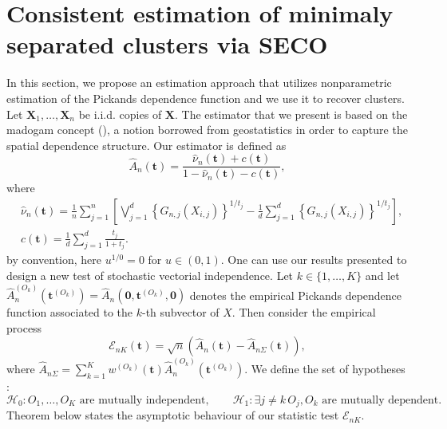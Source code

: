 \documentclass[11pt]{article}
\theoremstyle{definition}
\begin{document}
	\section{Consistent estimation of minimaly separated clusters via SECO}
	\label{sec:estimation}
	In this section, we propose an estimation approach that utilizes nonparametric estimation of the Pickands dependence function and we use it to recover clusters.
	Let $\textbf{X}_1, \dots, \textbf{X}_n$ be i.i.d. copies of $\textbf{X}$. The estimator that we present is based on the madogam concept (\cite{cooley2006variograms, MARCON20171}), a notion borrowed from geostatistics in order to capture the spatial dependence structure. Our estimator is defined as 
	\begin{equation}
		\hat{A}_n(\textbf{t}) = \frac{\hat{\nu}_n(\textbf{t}) + c(\textbf{t})}{1-\hat{\nu}_n(\textbf{t})-c(\textbf{t})},
	\end{equation}
	where
	\begin{align*}
		& \hat{\nu}_n(\textbf{t}) = \frac{1}{n} \sum_{j=1}^n \left[\bigvee_{j=1}^d \left\{ G_{n,j} (X_{i,j}) \right\}^{1/t_j} - \frac{1}{d} \sum_{j=1}^d \left\{ G_{n,j}(X_{i,j}) \right\}^{1/t_j} \right], \\
		& c(\textbf{t}) = \frac{1}{d} \sum_{j=1}^d \frac{t_j}{1+t_j}.
	\end{align*}
	by convention, here $u^{1/0} = 0$ for $u \in (0,1)$. One can use our results presented to design a new test of stochastic vectorial independence. Let $k\in\{1,\dots,K\}$ and let $\hat{A}_{n}^{(O_k)}(\textbf{t}^{(O_k)}) = \hat{A}_n(\textbf{0},\textbf{t}^{(O_k)}, \textbf{0})$ denotes the empirical Pickands dependence function associated to the $k$-th subvector of $X$. Then consider the empirical process
	\begin{equation}
		\mathcal{E}_{nK} (\textbf{t}) = \sqrt{n}\left(\hat{A}_n(\textbf{t}) - \hat{A}_{n\Sigma}(\textbf{t}) \right),
	\end{equation}
	where $\hat{A}_{n\Sigma} = \sum_{k=1}^K w^{(O_k)}(\textbf{t}) \hat{A}_{n}^{(O_k)}(\textbf{t}^{(O_k)})$. We define the set of hypotheses :
	\begin{equation*}
		\mathcal{H}_0 : O_1, \dots, O_K \textrm{ are mutually independent}, \quad \quad \mathcal{H}_1 : \exists j \neq k \, O_j, O_k \textrm{ are mutually dependent}.
	\end{equation*}
	Theorem below states the asymptotic behaviour of our statistic test $\mathcal{E}_{nK}$.
\end{document}
